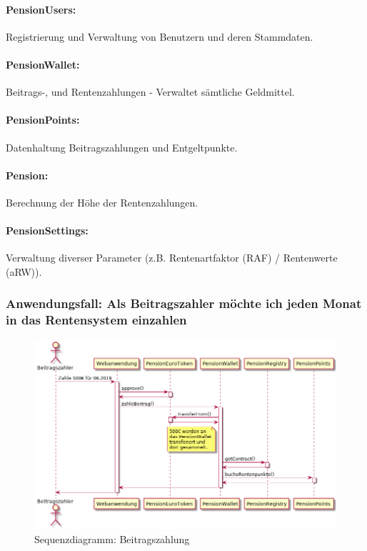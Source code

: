 \paragraph*{PensionUsers:} Registrierung und Verwaltung von Benutzern und deren Stammdaten.

\paragraph*{PensionWallet:} Beitrags-, und Rentenzahlungen - Verwaltet sämtliche Geldmittel.


\paragraph*{PensionPoints:} Datenhaltung Beitragszahlungen und Entgeltpunkte.

\paragraph*{Pension:} Berechnung der Höhe der Rentenzahlungen.

\paragraph*{PensionSettings:} Verwaltung diverser Parameter (z.B. Rentenartfaktor (RAF) / Rentenwerte (aRW)).

\subsubsection{Anwendungsfall: Als Beitragszahler möchte ich jeden Monat in das Rentensystem einzahlen}

\begin{figure}[H]
    \centering
    \includegraphics[width=6.0in]{images/usecase-pay.png}
    \caption{Sequenzdiagramm: Beitragszahlung}
    \label{fig:asure_architecture}
\end{figure}

